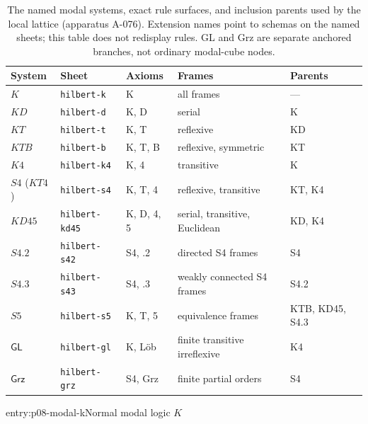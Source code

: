 \begin{table}[!htbp]
\centering
\small
\begin{tabular}{@{}p{}p{}p{}p{}p{}@{}}
\toprule
System & Sheet & Axioms & Frames & Parents \\
\midrule
\(K\) & \texttt{hilbert-k} & K & all frames & --- \\
\(KD\) & \texttt{hilbert-d} & K, D & serial & K \\
\(KT\) & \texttt{hilbert-t} & K, T & reflexive & KD \\
\(KTB\) & \texttt{hilbert-b} & K, T, B & reflexive, symmetric & KT \\
\(K4\) & \texttt{hilbert-k4} & K, 4 & transitive & K \\
\(S4\) (\(KT4\)) & \texttt{hilbert-s4} & K, T, 4 & reflexive, transitive & KT, K4 \\
\(KD45\) & \texttt{hilbert-kd45} & K, D, 4, 5 & serial, transitive, Euclidean & KD, K4 \\
\(S4.2\) & \texttt{hilbert-s42} & S4, .2 & directed S4 frames & S4 \\
\(S4.3\) & \texttt{hilbert-s43} & S4, .3 & weakly connected S4 frames & S4.2 \\
\(S5\) & \texttt{hilbert-s5} & K, T, 5 & equivalence frames & KTB, KD45, S4.3 \\
\(\mathsf{GL}\) & \texttt{hilbert-gl} & K, L\"ob & finite transitive irreflexive & K4 \\
\(\mathsf{Grz}\) & \texttt{hilbert-grz} & S4, Grz & finite partial orders & S4 \\
\bottomrule
\end{tabular}
\caption{The named modal systems, exact rule surfaces, and inclusion parents
used by the local lattice (apparatus A-076).  Extension names point to schemas
on the named sheets; this table does not redisplay rules.  GL and Grz are
separate anchored branches, not ordinary modal-cube nodes.}
\label{tab:p08-modal-systems}
\end{table}

\begin{systementry}{entry:p08-modal-k}{Normal modal logic \(K\)}
\end{systementry}

